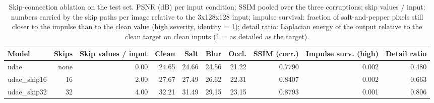 \begin{table}[t]
\centering
\caption{Skip-connection ablation on the test set. PSNR (dB) per input condition; SSIM pooled over the three corruptions; skip values / input: numbers carried by the skip paths per image relative to the 3x128x128 input; impulse survival: fraction of salt-and-pepper pixels still closer to the impulse than to the clean value (high severity, identity = 1); detail ratio: Laplacian energy of the output relative to the clean target on clean inputs (1 = as detailed as the target).}
\label{tab:task1_skip_ablation}
\begin{tabular}{lrrrrrrrrr}
\toprule
Model & Skips & Skip values / input & Clean & Salt & Blur & Occl. & SSIM (corr.) & Impulse surv. (high) & Detail ratio \\
\midrule
udae & none & 0.00 & 24.65 & 24.66 & 24.56 & 21.22 & 0.7790 & 0.002 & 0.480 \\
udae_skip16 & 16 & 2.00 & 27.67 & 27.49 & 26.62 & 22.31 & 0.8407 & 0.002 & 0.663 \\
udae_skip32 & 32 & 4.00 & 32.21 & 31.49 & 29.15 & 23.15 & 0.8793 & 0.001 & 0.806 \\
\bottomrule
\end{tabular}
\end{table}
